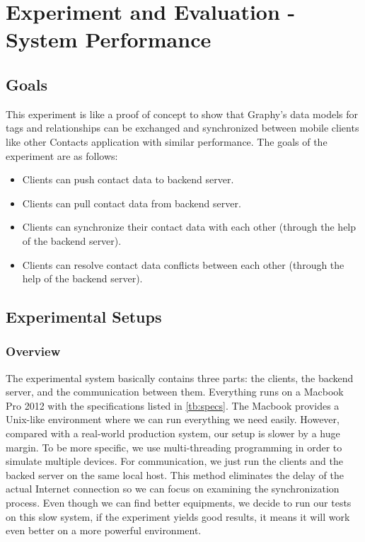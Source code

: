 \chapter{Experiment and Evaluation - System Performance}
\section{Goals}
This experiment is like a proof of concept to show that Graphy's data models for tags and relationships can be exchanged and synchronized between mobile clients like other Contacts application with similar performance. The goals of the experiment are as follows:

\begin{itemize}
    \item Clients can push contact data to backend server.
    \item Clients can pull contact data from backend server.
    \item Clients can synchronize their contact data with each other (through the help of the backend server).
    \item Clients can resolve contact data conflicts between each other (through the help of the backend server).
\end{itemize}

\section{Experimental Setups}
\subsection{Overview}
The experimental system basically contains three parts: the clients, the backend server, and the communication between them. Everything runs on a Macbook Pro 2012 with the specifications listed in \autoref{tb:specs}. The Macbook provides a Unix-like environment where we can run everything we need easily. However, compared with a real-world production system, our setup is slower by a huge margin. To be more specific, we use multi-threading programming in order to simulate multiple devices. For communication, we just run the clients and the backed server on the same local host. This method eliminates the delay of the actual Internet connection so we can focus on examining the synchronization process. Even though we can find better equipments, we decide to run our tests on this slow system, if the experiment yields good results, it means it will work even better on a more powerful environment.

